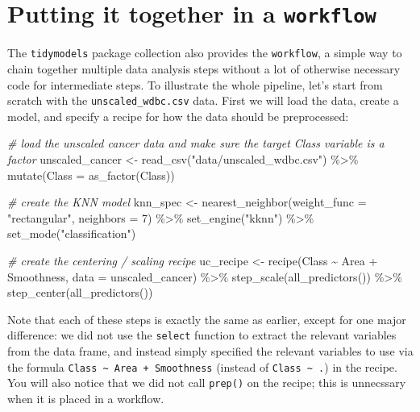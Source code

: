 \documentclass[
]{krantz}
\makeatletter
\newenvironment{Shaded}{\begin{snugshade}}{\end{snugshade}}
\newcommand{\AttributeTok}[1]{\textcolor[rgb]{0.61,0.61,0.61}{#1}}
\newcommand{\CommentTok}[1]{\textcolor[rgb]{0.37,0.37,0.37}{\textit{#1}}}
\newcommand{\DecValTok}[1]{\textcolor[rgb]{0.06,0.06,0.06}{#1}}
\newcommand{\FunctionTok}[1]{\textcolor[rgb]{0,0,0}{#1}}
\newcommand{\NormalTok}[1]{#1}
\newcommand{\OtherTok}[1]{\textcolor[rgb]{0.37,0.37,0.37}{#1}}
\newcommand{\SpecialCharTok}[1]{\textcolor[rgb]{0,0,0}{#1}}
\newcommand{\StringTok}[1]{\textcolor[rgb]{0.5,0.5,0.5}{#1}}
\newenvironment{kframe}{%
\medskip{}
\setlength{\fboxsep}{.8em}
 \def\at@end@of@kframe{}%
 \ifinner\ifhmode%
  \def\at@end@of@kframe{\end{minipage}}%
  \begin{minipage}{\columnwidth}%
 \fi\fi%
 \def\FrameCommand##1{\hskip\@totalleftmargin \hskip-\fboxsep
 \colorbox{shadecolor}{##1}\hskip-\fboxsep
     \hskip-\linewidth \hskip-\@totalleftmargin \hskip\columnwidth}%
 \MakeFramed {\advance\hsize-\width
   \@totalleftmargin\z@ \linewidth\hsize
   \@setminipage}}%
 {\par\unskip\endMakeFramed%
 \at@end@of@kframe}
\renewenvironment{Shaded}{\begin{kframe}}{\end{kframe}}
\makeatother
\begin{document}
\hypertarget{putting-it-together-in-a-workflow}{%
\section{\texorpdfstring{Putting it together in a \texttt{workflow}}{Putting it together in a workflow}}\label{putting-it-together-in-a-workflow}}

The \texttt{tidymodels} package collection also provides the \texttt{workflow}, a simple way to chain
together multiple data analysis steps without a lot of otherwise necessary code for intermediate steps.
To illustrate the whole pipeline, let's start from scratch with the \texttt{unscaled\_wdbc.csv} data.
First we will load the data, create a model, and specify a recipe for how the data should be preprocessed:

\begin{Shaded}
\begin{Highlighting}[]
\CommentTok{\# load the unscaled cancer data and make sure the target Class variable is a factor}
\NormalTok{unscaled\_cancer }\OtherTok{\textless{}{-}} \FunctionTok{read\_csv}\NormalTok{(}\StringTok{"data/unscaled\_wdbc.csv"}\NormalTok{) }\SpecialCharTok{\%\textgreater{}\%}
  \FunctionTok{mutate}\NormalTok{(}\AttributeTok{Class =} \FunctionTok{as\_factor}\NormalTok{(Class))}

\CommentTok{\# create the KNN model}
\NormalTok{knn\_spec }\OtherTok{\textless{}{-}} \FunctionTok{nearest\_neighbor}\NormalTok{(}\AttributeTok{weight\_func =} \StringTok{"rectangular"}\NormalTok{, }\AttributeTok{neighbors =} \DecValTok{7}\NormalTok{) }\SpecialCharTok{\%\textgreater{}\%}
  \FunctionTok{set\_engine}\NormalTok{(}\StringTok{"kknn"}\NormalTok{) }\SpecialCharTok{\%\textgreater{}\%}
  \FunctionTok{set\_mode}\NormalTok{(}\StringTok{"classification"}\NormalTok{)}

\CommentTok{\# create the centering / scaling recipe}
\NormalTok{uc\_recipe }\OtherTok{\textless{}{-}} \FunctionTok{recipe}\NormalTok{(Class }\SpecialCharTok{\textasciitilde{}}\NormalTok{ Area }\SpecialCharTok{+}\NormalTok{ Smoothness, }\AttributeTok{data =}\NormalTok{ unscaled\_cancer) }\SpecialCharTok{\%\textgreater{}\%}
  \FunctionTok{step\_scale}\NormalTok{(}\FunctionTok{all\_predictors}\NormalTok{()) }\SpecialCharTok{\%\textgreater{}\%}
  \FunctionTok{step\_center}\NormalTok{(}\FunctionTok{all\_predictors}\NormalTok{())}
\end{Highlighting}
\end{Shaded}

Note that each of these steps is exactly the same as earlier, except for one major difference:
we did not use the \texttt{select} function to extract the relevant variables from the data frame,
and instead simply specified the relevant variables to use via the
formula \texttt{Class\ \textasciitilde{}\ Area\ +\ Smoothness} (instead of \texttt{Class\ \textasciitilde{}\ .}) in the recipe.
You will also notice that we did not call \texttt{prep()} on the recipe; this is unnecssary when it is
placed in a workflow.
\end{document}
